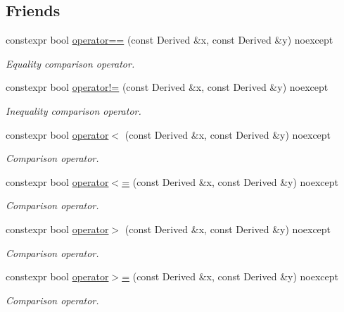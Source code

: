 \subsection*{Friends}
\begin{DoxyCompactItemize}
\item 
constexpr bool \hyperlink{class_mdt_1_1_numeric_1_1_physics_type_a19bbcf82001900576c9738089b6efda8}{operator==} (const Derived \&x, const Derived \&y) noexcept
\begin{DoxyCompactList}\small\item\em Equality comparison operator. \end{DoxyCompactList}\item 
constexpr bool \hyperlink{class_mdt_1_1_numeric_1_1_physics_type_a5a810023f7517c4f4e45ce70c5da90e4}{operator!=} (const Derived \&x, const Derived \&y) noexcept
\begin{DoxyCompactList}\small\item\em Inequality comparison operator. \end{DoxyCompactList}\item 
constexpr bool \hyperlink{class_mdt_1_1_numeric_1_1_physics_type_ada4582d450e1a194357e30c1adb28fc1}{operator$<$} (const Derived \&x, const Derived \&y) noexcept
\begin{DoxyCompactList}\small\item\em Comparison operator. \end{DoxyCompactList}\item 
constexpr bool \hyperlink{class_mdt_1_1_numeric_1_1_physics_type_a0ae0bdb484fc3c65b049303fc74a7143}{operator$<$=} (const Derived \&x, const Derived \&y) noexcept
\begin{DoxyCompactList}\small\item\em Comparison operator. \end{DoxyCompactList}\item 
constexpr bool \hyperlink{class_mdt_1_1_numeric_1_1_physics_type_a4101b3710a0f4650ad71390d56730267}{operator$>$} (const Derived \&x, const Derived \&y) noexcept
\begin{DoxyCompactList}\small\item\em Comparison operator. \end{DoxyCompactList}\item 
constexpr bool \hyperlink{class_mdt_1_1_numeric_1_1_physics_type_af4568b37fec8d78d9fd949ac96a60cda}{operator$>$=} (const Derived \&x, const Derived \&y) noexcept
\begin{DoxyCompactList}\small\item\em Comparison operator. \end{DoxyCompactList}\item 

\end{DoxyCompactItemize}
